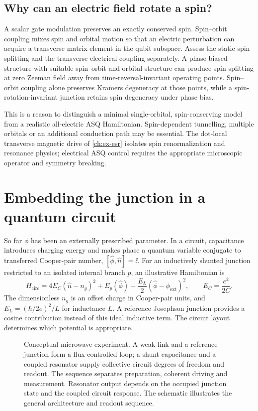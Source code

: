 \subsection{Why can an electric field rotate a spin?}

A scalar gate modulation preserves an exactly conserved spin. Spin--orbit
coupling mixes spin and orbital motion so that an electric perturbation can
acquire a transverse matrix element in the qubit subspace. Assess the static
spin splitting and the transverse electrical coupling separately. A phase-biased
structure with suitable spin--orbit and orbital structure can produce spin splitting
at zero Zeeman field away from time-reversal-invariant operating points.
Spin--orbit coupling alone preserves Kramers degeneracy at those points, while
a spin-rotation-invariant junction retains spin degeneracy under phase bias.

This is a reason to distinguish a minimal single-orbital, spin-conserving model
from a realistic all-electric ASQ Hamiltonian. Spin-dependent tunnelling,
multiple orbitals or an additional conduction path may be essential. The
dot-local transverse magnetic drive of \cref{ch:ex-esr} isolates spin
renormalization and resonance physics; electrical ASQ control requires the
appropriate microscopic operator and symmetry breaking.

\section{Embedding the junction in a quantum circuit}\label{sec:circuit-picture}

So far $\phi$ has been an externally prescribed parameter. In a circuit,
capacitance introduces charging energy and makes phase a quantum variable
conjugate to transferred Cooper-pair number, $[\hat\phi,\hat n]=\ii$. For an
inductively shunted junction restricted to an isolated internal branch $p$, an
illustrative Hamiltonian is
\begin{equation}\label{eq:primer-circuit}
 H_{\mathrm{circ}}=4E_C(\hat n-n_g)^2+E_p(\hat\phi)
                  +\frac{E_L}{2}(\hat\phi-\phi_{\mathrm{ext}})^2,
 \qquad E_C=\frac{e^2}{2C}.
\end{equation}
The dimensionless $n_g$ is an offset charge in Cooper-pair units, and
$E_L=(\hbar/2e)^2/L$ for inductance $L$. A reference Josephson junction provides
a cosine contribution instead of this ideal inductive term. The circuit layout
determines which potential is appropriate.

\begin{figure}[htb]
\centering{}
\caption{Conceptual microwave experiment. A weak link and a reference junction
form a flux-controlled loop; a shunt capacitance and a coupled resonator supply
collective circuit degrees of freedom and readout. The sequence separates
preparation, coherent driving and measurement. Resonator output depends on the
occupied junction state and the coupled circuit response. The schematic illustrates
the general architecture and readout sequence.}
\label{fig:primer-circuit}
\end{figure}

